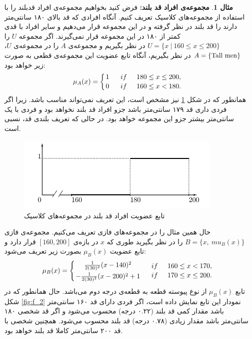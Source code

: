 \documentclass[12pt,a4paper]{article}
\theoremstyle{definition}
\newtheorem{exmp}{مثال}[section]
\begin{document}
\begin{exmp}\label{ex:e_1}
	\textbf{مجموعه‌ی افراد قد بلند:} فرض کنید بخواهیم مجموعه‌ی افراد قدبلند را با استفاده از مجموعه‌های کلاسیک تعریف کنیم. آنگاه افرادی که قد بالای ۱۸۰ سانتی‌متر دارند را قد بلند در نظر گرفته و در این مجموعه قرار می‌دهیم و سایر افراد با قدی کمتر از ۱۸۰ در این مجموعه قرار نمی‌گیرند. اگر مجموعه $U$ را   
	$U = \{ x\ |\ 160 \le x \le 200 \}$
	در نظر بگیریم و مجموعه‌ی $A$ را در مجموعه‌ی $U$، 
	$A = \{ {\rm Tall\ men} \}$
	در نظر بگیریم، آنگاه تابع عضویت این مجموعه‌ی قطعی به صورت زیر خواهد بود:
\begin{equation}
\mu_{A}(x)=\left \{ 
{1 \atop 0}
\hskip 0.5cm
{if \hskip 0.5cm 180 \le x \le 200, \atop
	if \hskip 0.5cm  160 \le x < 180.} \right.
\end{equation}
همانطور که در شکل 
\ref{fig:f_1}
نیز مشخص است، این تعریف نمی‌تواند مناسب باشد. زیرا اگر فردی داری قد ۱۷۹ سانتی‌متر باشد جزو افراد قد بلند نخواهد بود و فردی با یک سانتی‌متر بیشتر جزو این مجموعه خواهد بود. در حالی که تعریف بلندی قد، نسبی است. \\
\begin{figure}[h]
	\centering 
	\includegraphics[width=100mm]{Images/Fig1.png}
	\vspace{-0.5cm}
	\caption{تابع عضویت افراد قد بلند در مجموعه‌های کلاسیک}\label{fig:f_1}
\end{figure}
حال همین مثال را در مجموعه‌های فازی تعریف می‌کنیم.  مجموعه‌ی فازی 
$B = \{ x,\ mu_{B}(x) \}$
را در نظر بگیرید طوری که $x$ در بازه‌ی $[160,200]$ قرار دارد و تابع عضویت 
$\mu_{B}(x)$
بصورت زیر تعریف می‌شود:
\begin{equation}
\mu_{B}(x)=\left \{
{
	  \frac{1}{2(30)^2}(x-140)^2
	  \atop
	  -\frac{1}{2(30)^2}(x-200)^2+1
}
\hskip 0.5cm
{
	if \hskip 0.5cm 160 \le x < 170,
	 \atop
   if \hskip 0.5cm  170 \le x \le 200.
} \right.
\end{equation}
تابع
$\mu_{B}(x)$
از نوع پیوسته قطعه به قطعه‌ی درجه دوم 
می‌باشد. حال همانطور که در شکل 
\ref{fig:f_2}
نمودار این تابع نمایش داده است، اگر فردی دارای قد ۱۶۰ سانتی‌متر باشد مقدار کمی قد بلند (۰.۲۲ درجه) محسوب می‌شود و اگر قد شخصی ۱۸۰ سانتی‌متر باشد مقدار زیادی (۰.۷۸ درجه) قد بلند محسوب می‌شود. همچنین شخصی با قد ۲۰۰ سانتی‌متر کاملا قد بلند خواهد بود.

\end{exmp}
\end{document}
